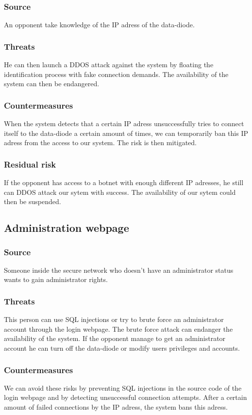 \documentclass[a4paper,11pt]{article}
\begin{document}
\subsubsection{Source}
An opponent take knowledge of the IP adress of the data-diode.
\subsubsection{Threats}
He can then launch a DDOS attack against the system by floating the identification process with fake connection demands. The availability of the system can then be endangered.
\subsubsection{Countermeasures}
When the system detects that a certain IP adress unsuccessfully tries to connect itself to the data-diode a certain amount of times, we can temporarily ban this IP adress from the access to our system.  The risk is then mitigated.
\subsubsection{Residual risk}
If the opponent has access to a botnet with enough different IP adresses, he still can DDOS attack our sytem with success. The availability of our sytem could then be suspended.
\subsection{Administration webpage}
\subsubsection{Source}
Someone inside the secure network who doesn't have an administrator status wants to gain administrator rights.

\subsubsection{Threats}
This person can use SQL injections or try to brute force an administrator account through the login webpage. The brute force attack can endanger the availability of the system. If the opponent manage to get an administrator account he can turn off the data-diode or modify users privileges and accounts.
\subsubsection{Countermeasures}
We can avoid these risks by preventing SQL injections in the source code of the login webpage and by detecting unsuccessful connection attempts. After a certain amount of failed connections by the IP adress, the system bans this adress.
\end{document}
